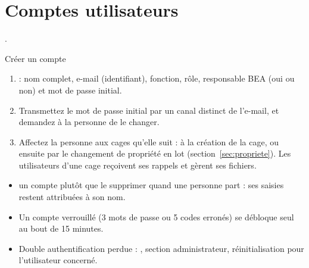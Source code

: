 \documentclass[11pt,a4paper]{article}
\begin{document}
\section{Comptes utilisateurs}
.
\begin{procedure}{Créer un compte}
\begin{enumerate}
  \item {} : nom complet, e-mail (identifiant),
    fonction, rôle, responsable BEA (oui ou non) et mot de passe initial.
  \item Transmettez le mot de passe initial par un canal distinct de
    l'e-mail, et demandez à la personne de le changer.
  \item Affectez la personne aux cages qu'elle suit : à la création de la
    cage, ou ensuite par le changement de propriété en lot
    (section~\ref{sec:propriete}). Les utilisateurs d'une cage reçoivent ses
    rappels et gèrent ses fichiers.
\end{enumerate}
\end{procedure}
\begin{itemize}
  \item {} un compte plutôt que le supprimer quand une personne
    part : ses saisies restent attribuées à son nom.
  \item Un compte verrouillé (3 mots de passe ou 5 codes erronés) se
    débloque seul au bout de 15 minutes.
  \item Double authentification perdue :
    , section administrateur,
    réinitialisation pour l'utilisateur concerné.
\end{itemize}
\end{document}
